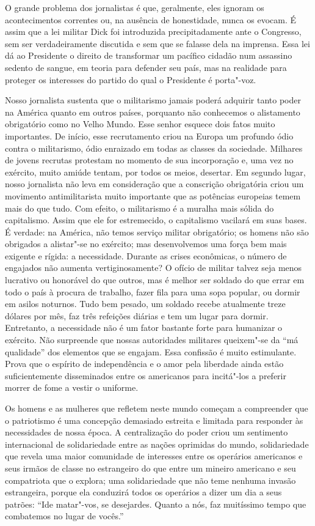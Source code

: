 O grande problema dos jornalistas é que, geralmente, eles ignoram os
acontecimentos correntes ou, na ausência de honestidade, nunca os
evocam. É assim que a lei militar Dick foi introduzida precipitadamente
ante o Congresso, sem ser verdadeiramente discutida e sem que se
falasse dela na imprensa. Essa lei dá ao Presidente o direito de
transformar um pacífico cidadão num assassino sedento de sangue, em
teoria para defender seu país, mas na realidade para proteger os
interesses do partido do qual o Presidente é porta"-voz.

Nosso jornalista sustenta que o militarismo jamais poderá adquirir tanto
poder na América quanto em outros países, porquanto não conhecemos o
alistamento obrigatório como no Velho Mundo. Esse senhor esquece dois
fatos muito importantes. De início, esse recrutamento criou na Europa
um profundo ódio contra o militarismo, ódio enraizado em todas as
classes da sociedade. Milhares de jovens recrutas protestam no momento
de sua incorporação e, uma vez no exército, muito amiúde tentam, por
todos os meios, desertar. Em segundo lugar, nosso jornalista não leva
em consideração que a conscrição obrigatória criou um movimento
antimilitarista muito importante que as potências europeias temem mais
do que tudo. Com efeito, o militarismo é a muralha mais sólida do
capitalismo. Assim que ele for estremecido, o capitalismo vacilará em
suas bases. É verdade: na América, não temos serviço militar
obrigatório; os homens não são obrigados a alistar"-se no exército;
mas desenvolvemos uma força bem mais exigente e rígida: a necessidade.
Durante as crises econômicas, o número de engajados não aumenta
vertiginosamente? O ofício de militar talvez seja menos lucrativo ou
honorável do que outros, mas é melhor ser soldado do que errar em todo
o país à procura de trabalho, fazer fila para uma sopa popular, ou
dormir em asilos noturnos. Tudo bem pesado, um soldado recebe
atualmente treze dólares por mês, faz três refeições diárias e tem um
lugar para dormir. Entretanto, a necessidade não é um fator bastante
forte para humanizar o exército. Não surpreende que nossas
autoridades militares queixem"-se da “má qualidade” dos elementos que
se engajam. Essa confissão é muito estimulante. Prova que o espírito de
independência e o amor pela liberdade ainda estão suficientemente
disseminados entre os americanos para incitá"-los a preferir morrer de
fome a vestir o uniforme.

Os homens e as mulheres que refletem neste mundo começam a compreender
que o patriotismo é uma concepção demasiado estreita e limitada para
responder às necessidades de nossa época. A centralização do poder
criou um sentimento internacional de solidariedade entre as nações
oprimidas do mundo, solidariedade que revela uma maior comunidade de
interesses entre os operários americanos e seus irmãos de classe no
estrangeiro do que entre um mineiro americano e seu compatriota que o
explora; uma solidariedade que não teme nenhuma invasão estrangeira,
porque ela conduzirá todos os operários a dizer um dia a seus patrões:
“Ide matar"-vos, se desejardes. Quanto a nós, faz muitíssimo tempo que
combatemos no lugar de vocês.”

